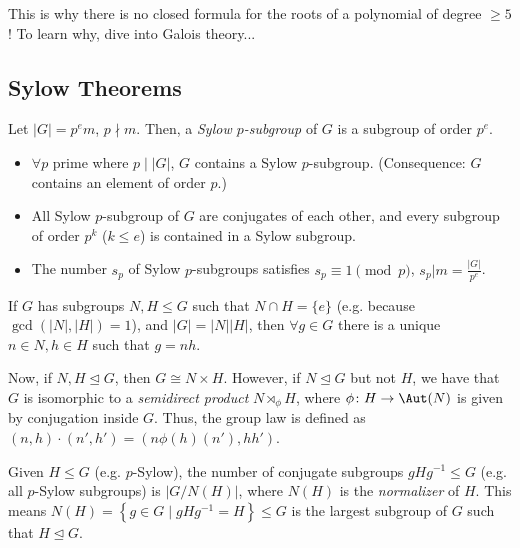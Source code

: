 \documentclass{notes}
\begin{document}
\begin{remark}
    This is why there is no closed formula for the roots of a polynomial of degree $\ge 5$! To learn why, dive into Galois theory...
\end{remark}

\subsection{Sylow Theorems}

\begin{theorem}
    Let $|G|=p^em$, $p\nmid m$. Then, a \emph{Sylow $p$-subgroup} of $G$ is a subgroup of order $p^e$.
    \begin{itemize}
        \item $\forall p$ prime where $p\mid  |G|$, $G$ contains a Sylow $p$-subgroup. (Consequence: $G$ contains an element of order $p$.)
        \item All Sylow $p$-subgroup of $G$  are conjugates of each other, and every subgroup of order $p^k$ ($k\le e$) is contained in a Sylow subgroup.
        \item The number $s_p$ of Sylow $p$-subgroups satisfies $s_p\equiv 1\pmod{p}$, $s_p|m=\frac{|G|}{p^e}$.
    \end{itemize}
\end{theorem}

\begin{defn}
    If $G$ has subgroups $N,H\le G$ such that $N\cap H=\{e\}$ (e.g. because $\gcd(|N|,|H|)=1$), and $|G|=|N| |H|$, then $\forall g\in G$ there is a unique $n\in N,h\in H$ such that $g=nh$.
    
    Now, if $N,H\trianglelefteq G$, then $G\cong N\times H$. However, if $N\trianglelefteq  G$ but not $H$, we have that $G$ is isomorphic to a \emph{semidirect product} $N\rtimes _\phi H$, where $\phi \colon H \to \Aut (N) $ is given by conjugation inside $G$. Thus, the group law is defined as $(n,h)\cdot (n',h')=(n\phi (h)(n'),hh')$. 
\end{defn}

\begin{theorem}
    Given $H\le G$ (e.g. $p$-Sylow), the number of conjugate subgroups $gHg^{-1}\le G$ (e.g. all $p$-Sylow subgroups) is $|G/N(H)|$, where $N(H)$ is the \emph{normalizer} of $H$. This means $N(H)=\left\{ g\in G\mid  gHg^{-1}=H \right\} \le G$ is the largest subgroup of $G$ such that $H \trianglelefteq G$.
\end{theorem}
\end{document}
